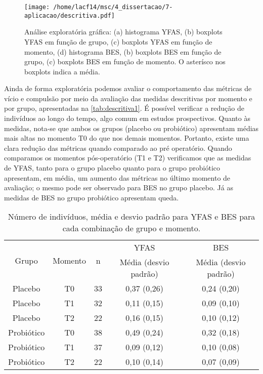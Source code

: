 \begin{figure}[H]
\centering
\texttt{[image: /home/lacf14/msc/4\_dissertacao/7-aplicacao/descritiva.pdf]}
\caption{Análise exploratória gráfica: (a) histograma YFAS, (b) boxplots YFAS em função de grupo, (c) boxplots YFAS em função de momento, (d) histograma BES, (b) boxplots BES em função de grupo, (c) boxplots BES em função de momento. O asterísco nos boxplots indica a média.}
\label{fig:descritiva2}
\end{figure}

Ainda de forma exploratória podemos avaliar o comportamento das métricas de vício e compulsão por meio da avaliação das medidas descritivas por momento e por grupo, apresentadas na \autoref{tab:descritiva1}. É possível verificar a redução de indivíduos ao longo do tempo, algo comum em estudos prospectivos. Quanto às medidas, nota-se que ambos os grupos (placebo ou probiótico) apresentam médias mais altas no momento T0 do que nos demais momentos. Portanto, existe uma clara redução das métricas quando comparado ao pré operatório. Quando comparamos os momentos pós-operatório (T1 e T2) verificamos que as medidas de YFAS, tanto para o grupo placebo quanto para o grupo probiótico apresentam, em média, um aumento das métricas no último momento de avaliação; o mesmo pode ser observado para BES no grupo placebo. Já as medidas de BES no grupo probiótico apresentam queda.

\begin{table}[H]
\centering
\begin{tabular}{ccccc}
\hline
\multirow{2}{*}{Grupo} & \multirow{2}{*}{Momento} & \multirow{2}{*}{n} & YFAS                  & BES                   \\ \cline{4-5} 
                       &                          &                    & Média (desvio padrão) & Média (desvio padrão) \\ \hline
Placebo                & T0                       & 33                 & 0,37 (0,26)           & 0,24 (0,20)           \\
Placebo                & T1                       & 32                 & 0,11 (0,15)           & 0,09 (0,10)           \\
Placebo                & T2                       & 22                 & 0,16 (0,15)           & 0,10 (0,12)           \\
Probiótico             & T0                       & 38                 & 0,49 (0,24)           & 0,32 (0,18)           \\
Probiótico             & T1                       & 37                 & 0,09 (0,12)           & 0,10 (0,08)           \\
Probiótico             & T2                       & 22                 & 0,10 (0,14)           & 0,07 (0,09)           \\ \hline
\end{tabular}
\caption{Número de indivíduos, média e desvio padrão para YFAS e BES para cada combinação de grupo e momento.}
\label{tab:descritiva1}
\end{table}

